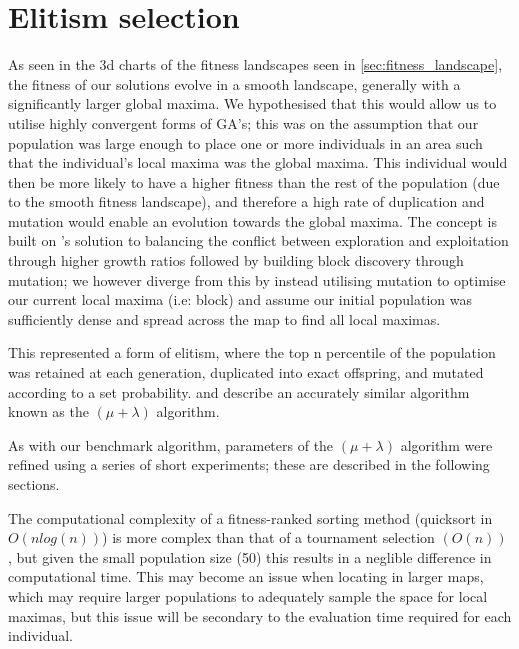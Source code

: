 \documentclass[authoryearcitations]{UoYCSproject}
\begin{document}
\section{Elitism selection}
\label{subsec:elitism_sel}
As seen in the 3d charts of the fitness landscapes seen in \autoref{sec:fitness_landscape}, the fitness of our solutions evolve in a smooth landscape, generally with a significantly larger global maxima. We hypothesised that this would allow us to utilise highly convergent forms of GA's; this was on the assumption that our population was large enough to place one or more individuals in an area such that the individual's local maxima was the global maxima. This individual would then be more likely to have a higher fitness than the rest of the population (due to the smooth fitness landscape), and therefore a high rate of duplication and mutation would enable an evolution towards the global maxima. The concept is built on \citet{David_E_Goldberg1991-es}'s solution to balancing the conflict between exploration and exploitation through higher growth ratios followed by building block discovery through mutation; we however diverge from this by instead utilising mutation to optimise our current local maxima (i.e: block) and assume our initial population was sufficiently dense and spread across the map to find all local maximas.
	
This represented a form of elitism, where the top n percentile of the population was retained at each generation, duplicated into exact offspring, and mutated according to a set probability. \citet{T_Back_D_B_Fogel_T_Michalewicz} and \citet{Shapiro1992-qm} describe an accurately similar algorithm known as the $(\mu + \lambda)$  algorithm.

As with our benchmark algorithm, parameters of the $(\mu + \lambda)$ algorithm were refined using a series of short experiments; these are described in the following sections.

The computational complexity of a fitness-ranked sorting method (quicksort in $O(n log (n))$) is more complex  \cite{Mitchell1998-td} than that of a tournament selection $(O(n))$ \cite{David_E_Goldberg1991-es}, but given the small population size (50) this results in a neglible difference in computational time. This may become an issue when locating in larger maps, which may require larger populations to adequately sample the space for local maximas, but this issue will be secondary to the evaluation time required for each individual.
\end{document}
